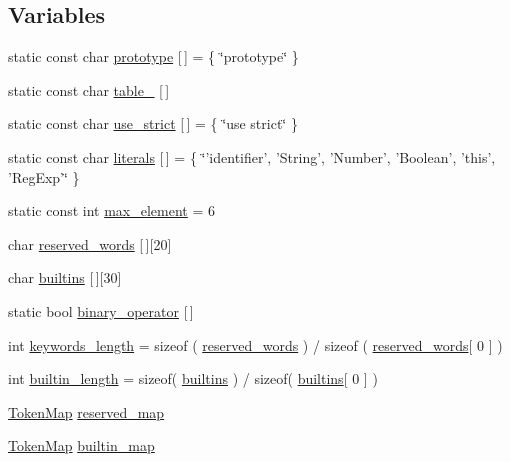 \subsection*{Variables}
\begin{DoxyCompactItemize}
\item 
static const char \hyperlink{namespacemocha_adf5b9fa11b01461bf5f1aca4f93c29bd}{prototype} \mbox{[}$\,$\mbox{]} = \{ \char`\"{}prototype\char`\"{} \}
\item 
static const char \hyperlink{namespacemocha_a79233380c6ba0832a54e749c1858899e}{table\_\-} \mbox{[}$\,$\mbox{]}
\item 
static const char \hyperlink{namespacemocha_aff8b386388ac986cc23a7a9837a220d8}{use\_\-strict} \mbox{[}$\,$\mbox{]} = \{ \char`\"{}use strict\char`\"{} \}
\item 
static const char \hyperlink{namespacemocha_a26281cbe58723001ac1ce3442687794b}{literals} \mbox{[}$\,$\mbox{]} = \{ \char`\"{}'identifier', 'String', 'Number', 'Boolean', 'this', 'RegExp'\char`\"{} \}
\item 
static const int \hyperlink{namespacemocha_a7c62b652d237959c56aa0f587d471292}{max\_\-element} = 6
\item 
char \hyperlink{namespacemocha_ad9756329f84e84742450210ab26bb610}{reserved\_\-words} \mbox{[}$\,$\mbox{]}\mbox{[}20\mbox{]}
\item 
char \hyperlink{namespacemocha_abc3ae3d8b9bb5cc5af9155e0b4b8039b}{builtins} \mbox{[}$\,$\mbox{]}\mbox{[}30\mbox{]}
\item 
static bool \hyperlink{namespacemocha_a944f298a899880ad69a3a3ebcbbd8d5e}{binary\_\-operator} \mbox{[}$\,$\mbox{]}
\item 
int \hyperlink{namespacemocha_ad1eae732a8341d26760d4c2f414bba27}{keywords\_\-length} = sizeof ( \hyperlink{namespacemocha_ad9756329f84e84742450210ab26bb610}{reserved\_\-words} ) / sizeof ( \hyperlink{namespacemocha_ad9756329f84e84742450210ab26bb610}{reserved\_\-words}\mbox{[} 0 \mbox{]} )
\item 
int \hyperlink{namespacemocha_a4fdbec5bf4adee2824ef9762bd136c55}{builtin\_\-length} = sizeof( \hyperlink{namespacemocha_abc3ae3d8b9bb5cc5af9155e0b4b8039b}{builtins} ) / sizeof( \hyperlink{namespacemocha_abc3ae3d8b9bb5cc5af9155e0b4b8039b}{builtins}\mbox{[} 0 \mbox{]} )
\item 
\hyperlink{classmocha_1_1_hash_map}{TokenMap} \hyperlink{namespacemocha_a9722600d13953bf4046df586b937cdf5}{reserved\_\-map}
\item 
\hyperlink{classmocha_1_1_hash_map}{TokenMap} \hyperlink{namespacemocha_aaacb26925f4ce13e96d411be146383b4}{builtin\_\-map}

\end{DoxyCompactItemize}
